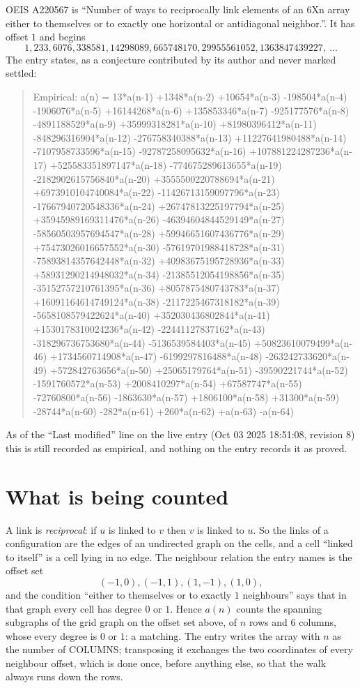\documentclass[11pt,a4paper]{article}
\theoremstyle{plain}
\theoremstyle{definition}
\begin{document}
OEIS A220567 is ``Number of ways to reciprocally link elements of an 6Xn array either to themselves or to exactly one horizontal or antidiagonal neighbor.''. It has offset $1$ and begins
\[
1, 233, 6076, 338581, 14298089, 665748170, 29955561052, 1363847439227,\ \dots
\]
The entry states, as a conjecture contributed by its author and never marked settled:
\begin{quote}
Empirical: a(n) = 13*a(n-1) +1348*a(n-2) +10654*a(n-3) -198504*a(n-4) -1906076*a(n-5) +16144268*a(n-6) +135853346*a(n-7) -925177576*a(n-8) -4891188529*a(n-9) +35999318281*a(n-10) +81980396412*a(n-11) -848296316904*a(n-12) -276758340388*a(n-13) +11227641980488*a(n-14) -7107958733596*a(n-15) -92787258095632*a(n-16) +107881224287236*a(n-17) +525583351897147*a(n-18) -774675289613655*a(n-19) -2182902615756840*a(n-20) +3555500220788694*a(n-21) +6973910104740084*a(n-22) -11426713159097796*a(n-23) -17667940720548336*a(n-24) +26747813225197794*a(n-25) +35945989169311476*a(n-26) -46394604844529149*a(n-27) -58560503957694547*a(n-28) +59946651607436776*a(n-29) +75473026016657552*a(n-30) -57619701988418728*a(n-31) -75893814357642448*a(n-32) +40983675195728936*a(n-33) +58931290214948032*a(n-34) -21385512054198856*a(n-35) -35152757210761395*a(n-36) +8057875480743783*a(n-37) +16091164614749124*a(n-38) -2117225467318182*a(n-39) -5658108579422624*a(n-40) +352030436802844*a(n-41) +1530178310024236*a(n-42) -22441127837162*a(n-43) -318296736753680*a(n-44) -5136539584403*a(n-45) +50823610079499*a(n-46) +1734560714908*a(n-47) -6199297816488*a(n-48) -263242733620*a(n-49) +572842763656*a(n-50) +25065179764*a(n-51) -39590221744*a(n-52) -1591760572*a(n-53) +2008410297*a(n-54) +67587747*a(n-55) -72760800*a(n-56) -1863630*a(n-57) +1806100*a(n-58) +31300*a(n-59) -28744*a(n-60) -282*a(n-61) +260*a(n-62) +a(n-63) -a(n-64)
\end{quote}
As of the ``Last modified'' line on the live entry (Oct 03 2025 18:51:08, revision 8) this is still
recorded as empirical, and nothing on the entry records it as proved.

\section{What is being counted}

A link is \emph{reciprocal}: if $u$ is linked to $v$ then $v$ is linked to $u$. So the links
of a configuration are the edges of an undirected graph on the cells, and a cell ``linked to
itself'' is a cell lying in no edge. The neighbour relation the entry names is the offset set
\[
(-1,0), (-1,1), (1,-1), (1,0),
\]
and the condition ``either to themselves or to exactly $1$ neighbours'' says that in that
graph every cell has degree $0$ or $1$. Hence $a(n)$ counts the spanning subgraphs of the
grid graph on the offset set above, of $n$ rows and $6$ columns,
whose every degree is $0$ or $1$: a matching. The entry writes the array with $n$ as the number of COLUMNS; transposing it exchanges the two coordinates of every neighbour offset, which is done once, before anything else, so that the walk always runs down the rows.
\end{document}
